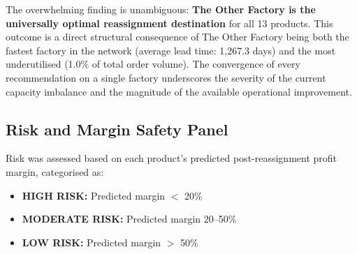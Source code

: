 \documentclass[12pt, a4paper]{article}
\begin{document}
The overwhelming finding is unambiguous: \textbf{The Other
Factory is the universally optimal reassignment destination}
for all 13 products. This outcome is a direct structural
consequence of The Other Factory being both the fastest
factory in the network (average lead time: 1,267.3 days)
and the most underutilised (1.0\% of total order volume).
The convergence of every recommendation on a single factory
underscores the severity of the current capacity imbalance
and the magnitude of the available operational improvement.

\subsection{Risk and Margin Safety Panel}

Risk was assessed based on each product's predicted
post-reassignment profit margin, categorised as:

\begin{itemize}[leftmargin=*, itemsep=2pt]
    \item \textcolor{riskhigh}{\textbf{HIGH RISK:}}
          Predicted margin $<$ 20\%
    \item \textcolor{riskmod}{\textbf{MODERATE RISK:}}
          Predicted margin 20--50\%
    \item \textcolor{risklow}{\textbf{LOW RISK:}}
          Predicted margin $>$ 50\%
\end{itemize}
\end{document}
